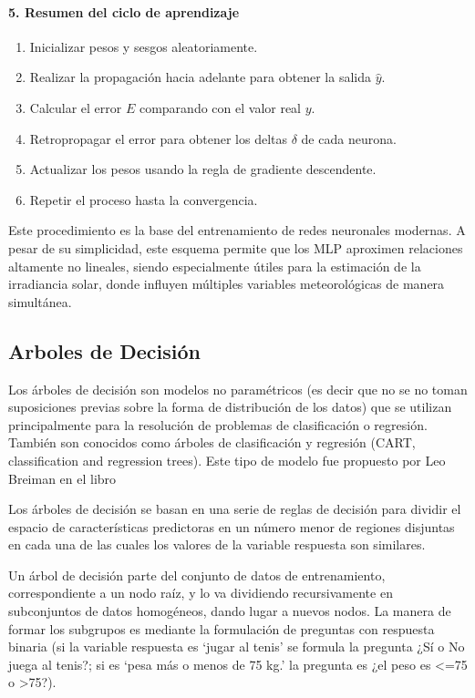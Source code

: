 \paragraph{5. Resumen del ciclo de aprendizaje}
\begin{enumerate}
    \item Inicializar pesos y sesgos aleatoriamente.
    \item Realizar la propagación hacia adelante para obtener la salida $\hat{y}$.
    \item Calcular el error $E$ comparando con el valor real $y$.
    \item Retropropagar el error para obtener los deltas $\delta$ de cada neurona.
    \item Actualizar los pesos usando la regla de gradiente descendente.
    \item Repetir el proceso hasta la convergencia.
\end{enumerate}

Este procedimiento es la base del entrenamiento de redes neuronales modernas. A pesar de su simplicidad, este esquema permite que los MLP aproximen relaciones altamente no lineales, siendo especialmente útiles para la estimación de la irradiancia solar, donde influyen múltiples variables meteorológicas de manera simultánea.













\subsection{Arboles de Decisión}
Los árboles de decisión son modelos no paramétricos (es decir que no se no toman suposiciones previas sobre la forma de distribución de los datos) que se utilizan principalmente para la resolución de problemas de clasificación o regresión. También son conocidos como árboles de clasificación y regresión (CART, classification and regression trees). Este tipo de modelo fue propuesto por Leo Breiman en el libro \cite{breiman1984}

Los árboles de decisión se basan en una serie de reglas de decisión para dividir el espacio de características predictoras en un número menor de regiones disjuntas en cada una de las cuales los valores de la variable respuesta son similares.

Un árbol de decisión parte del conjunto de datos de entrenamiento, correspondiente a un nodo raíz, y lo va dividiendo recursivamente en subconjuntos de datos homogéneos, dando lugar a nuevos nodos. La manera de formar los subgrupos es mediante la formulación de preguntas con respuesta binaria (si la variable respuesta es `jugar al tenis' se formula la pregunta ¿Sí o No juega al tenis?; si es `pesa más o menos de 75 kg.' la pregunta es ¿el peso es <=75 o >75?). \\

